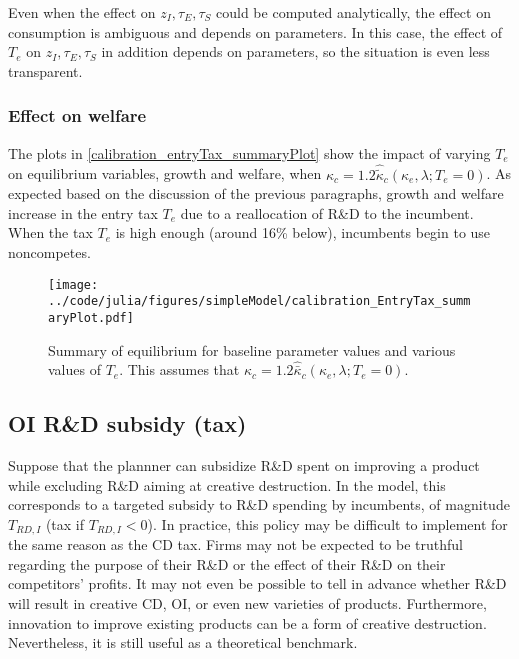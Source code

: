 \documentclass[11pt,english]{article}
\theoremstyle{remark}
\begin{document}
Even when the effect on $z_I,\tau_E,\tau_S$ could be computed analytically, the effect on consumption is ambiguous and depends on parameters. In this case, the effect of $T_e$ on $z_I,\tau_E,\tau_S$ in addition depends on parameters, so the situation is even less transparent. 

\subsubsection{Effect on welfare}

The plots in \autoref{calibration_entryTax_summaryPlot} show the impact of varying $T_e$ on equilibrium variables, growth and welfare, when $\kappa_c = 1.2 \hat{\tilde{\kappa}}_c(\kappa_e,\lambda;T_e = 0)$. As expected based on the discussion of the previous paragraphs, growth and welfare increase in the entry tax $T_e$ due to a reallocation of R\&D to the incumbent. When the tax $T_e$ is high enough (around 16\% below), incumbents begin to use noncompetes.  

\begin{figure}[]
	\texttt{[image: ../code/julia/figures/simpleModel/calibration\_EntryTax\_summaryPlot.pdf]}
	\caption{Summary of equilibrium for baseline parameter values and various values of $T_e$. This assumes that $\kappa_c = 1.2 \hat{\bar{\kappa}}_c(\kappa_e,\lambda;T_e = 0)$.}
	\label{calibration_entryTax_summaryPlot}
\end{figure}

\subsection{OI R\&D subsidy (tax)}\label{cs:oi_rd_subsidy}

Suppose that the plannner can subsidize R\&D spent on improving a product while excluding R\&D aiming at creative destruction. In the model, this corresponds to a targeted subsidy to R\&D spending by incumbents, of magnitude $T_{RD,I}$ (tax if $T_{RD,I} < 0$). In practice, this policy may be difficult to implement for the same reason as the CD tax. Firms may not be expected to be truthful regarding the purpose of their R\&D or the effect of their R\&D on their competitors' profits. It may not even be possible to tell in advance whether R\&D will result in creative CD, OI, or even new varieties of products. Furthermore, innovation to improve existing products can be a form of creative destruction. Nevertheless, it is still useful as a theoretical benchmark.
\end{document}
